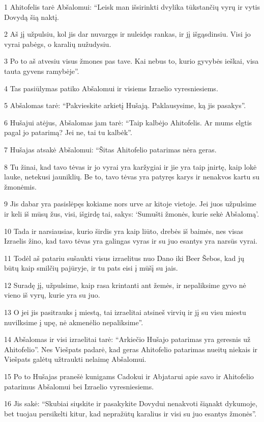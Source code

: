 \par 1 Ahitofelis tarė Abšalomui: “Leisk man išsirinkti dvylika tūkstančių vyrų ir vytis Dovydą šią naktį. 
\par 2 Aš jį užpulsiu, kol jis dar nuvargęs ir nuleidęs rankas, ir jį išgąsdinsiu. Visi jo vyrai pabėgs, o karalių nužudysiu. 
\par 3 Po to aš atvesiu visus žmones pas tave. Kai nebus to, kurio gyvybės ieškai, visa tauta gyvens ramybėje”. 
\par 4 Tas pasiūlymas patiko Abšalomui ir visiems Izraelio vyresniesiems. 
\par 5 Abšalomas tarė: “Pakvieskite arkietį Hušają. Paklausysime, ką jis pasakys”. 
\par 6 Hušajui atėjus, Abšalomas jam tarė: “Taip kalbėjo Ahitofelis. Ar mums elgtis pagal jo patarimą? Jei ne, tai tu kalbėk”. 
\par 7 Hušajas atsakė Abšalomui: “Šitas Ahitofelio patarimas nėra geras. 
\par 8 Tu žinai, kad tavo tėvas ir jo vyrai yra karžygiai ir jie yra taip įnirtę, kaip lokė lauke, netekusi jauniklių. Be to, tavo tėvas yra patyręs karys ir nenakvos kartu su žmonėmis. 
\par 9 Jis dabar yra pasislėpęs kokiame nors urve ar kitoje vietoje. Jei juos užpulsime ir keli iš mūsų žus, visi, išgirdę tai, sakys: ‘Sumušti žmonės, kurie sekė Abšalomą’. 
\par 10 Tada ir narsiausias, kurio širdis yra kaip liūto, drebės iš baimės, nes visas Izraelis žino, kad tavo tėvas yra galingas vyras ir su juo esantys yra narsūs vyrai. 
\par 11 Todėl aš patariu sušaukti visus izraelitus nuo Dano iki Beer Šebos, kad jų būtų kaip smilčių pajūryje, ir tu pats eisi į mūšį su jais. 
\par 12 Suradę jį, užpulsime, kaip rasa krintanti ant žemės, ir nepaliksime gyvo nė vieno iš vyrų, kurie yra su juo. 
\par 13 O jei jis pasitrauks į miestą, tai izraelitai atsineš virvių ir jį su visu miestu nuvilksime į upę, nė akmenėlio nepaliksime”. 
\par 14 Abšalomas ir visi izraelitai tarė: “Arkiečio Hušajo patarimas yra geresnis už Ahitofelio”. Nes Viešpats padarė, kad geras Ahitofelio patarimas nueitų niekais ir Viešpats galėtų užtraukti nelaimę Abšalomui. 
\par 15 Po to Hušajas pranešė kunigams Cadokui ir Abjatarui apie savo ir Ahitofelio patarimus Abšalomui bei Izraelio vyresniesiems. 
\par 16 Jis sakė: “Skubiai siųskite ir pasakykite Dovydui nenakvoti šiąnakt dykumoje, bet tuojau persikelti kitur, kad nepražūtų karalius ir visi su juo esantys žmonės”. 
